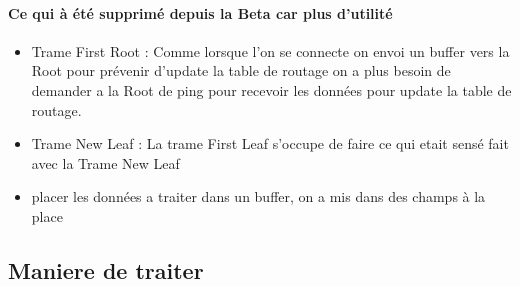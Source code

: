 \documentclass[a4paper,titlepage]{report}
\begin{document}
\paragraph{Ce qui à été supprimé depuis la Beta car plus d'utilité}
\begin{itemize}
\item Trame First Root : Comme lorsque l'on se connecte on envoi un buffer vers la Root pour prévenir d'update la table de routage on a plus besoin de demander a la Root de ping pour recevoir les données pour update la table de routage.
\item Trame New Leaf : La trame First Leaf s'occupe de faire ce qui etait sensé  fait avec la Trame New Leaf
\item placer les données a traiter dans un buffer, on a mis dans des champs à la place
\end{itemize}
\subsection{Maniere de traiter}
\end{document}
